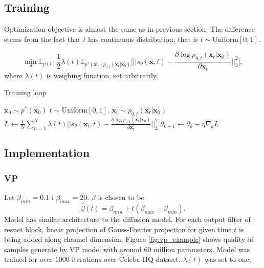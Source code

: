 \documentclass[10pt]{article}
\begin{document}
\subsection{Training}
Optimization objective is almost the same as in previous section. The difference stems from the fact that $t$ has continuous distribution, that is $t \sim \text{Uniform} [0, 1]$.

\begin{equation}
    \min_{\theta} \mathbb{E}_{p(t)}\frac{1}{2} \lambda(t) \mathbb{E}_{p^*(\textbf{x}_0)p_{0,t}(\textbf{x}_t | \textbf{x}_0 )  }
    \Big[ ||  s_{\theta}(\tilde{\textbf{x}}, t)  - 
    \frac{\partial \log p_{0,t}(\textbf{x}_t | \textbf{x}_0 )}  {\partial \textbf{x}_t } ||_2^2 \Big],
\end{equation}
where $\lambda(t)$ is weighing function, set arbitrarily.

\begin{algorithm} [H]
\caption{Training loop }\label{alg:cap}
\begin{algorithmic}
    \State $\textbf{x}_0 \sim p^*(\textbf{x}_0)$
    \State $t \sim \text{Uniform}[0, 1]$.
    \State $ \textbf{x}_t \sim p_{0,t}(\textbf{x}_t | \textbf{x}_0 )$
    \State $L \gets \frac{1}{N}\sum_{n=1}^N\lambda(t) 
    ||  s_{\theta}(\textbf{x}_t , t)  - 
    \frac{\partial \log p_{0,t}(\textbf{x}_t | \textbf{x}_0 )}
    {\partial \textbf{x}_t } ||_2^2$
    \State $\theta_{k+1} \gets \theta_{k} - \eta \nabla_{\theta}L$
    \EndWhile
\end{algorithmic}
\end{algorithm}
\subsection{Implementation}
\subsubsection{VP}
Let $\beta_{min} =0.1$ i $\beta_{max} = 20$. $ \hat{\beta}$ is chosen to be
\begin{equation}
    \hat{\beta}(t) = \beta_{min} + t(\beta_{max} - \beta_{min} ).
\end{equation}
Model has similar architecture to the diffusion model. For each output filter of resnet block, linear projection of Gauss-Fourier projection for given time $t$ is being added along channel dimension.
Figure \ref{fig:vp_example} shows quality of samples generate by VP model with around 60 million parameters. Model was trained for over 1000 iterations over  Celeba-HQ \cite{celeba_hq} dataset. $\lambda(t)$ was set to one,
\end{document}
